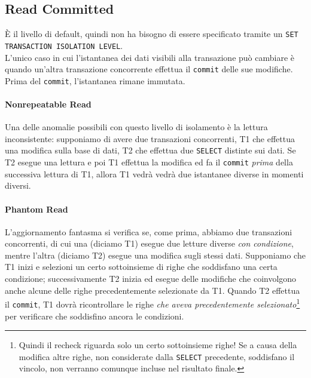 \documentclass[12pt,a4paper]{book}
\begin{document}
	\subsection{Read Committed}
	È il livello di default, quindi non ha bisogno di essere specificato tramite un \texttt{SET TRANSACTION ISOLATION LEVEL}.\\
	L'unico caso in cui l'istantanea dei dati visibili alla transazione può cambiare è quando un'altra transazione concorrente effettua il \texttt{commit} delle sue modifiche. Prima del \texttt{commit}, l'istantanea rimane immutata.
	\paragraph{Nonrepeatable Read} Una delle anomalie possibili con questo livello di isolamento è la lettura inconsistente: supponiamo di avere due transazioni concorrenti, T1 che effettua una modifica sulla base di dati, T2 che effettua due \texttt{SELECT} distinte sui dati. Se T2 esegue una lettura e poi T1 effettua la modifica ed fa il \texttt{commit} \textit{prima} della successiva lettura di T1, allora T1 vedrà vedrà due istantanee diverse in momenti diversi.\\
	\paragraph{Phantom Read} L'aggiornamento fantasma si verifica se, come prima, abbiamo due transazioni concorrenti, di cui una (diciamo T1) esegue due letture diverse \textit{con condizione}, mentre l'altra (diciamo T2) esegue una modifica sugli stessi dati.
	Supponiamo che T1 inizi e selezioni un certo sottoinsieme di righe che soddisfano una certa condizione; successivamente T2 inizia ed esegue delle modifiche che coinvolgono anche alcune delle righe precedentemente selezionate da T1. Quando T2 effettua il \texttt{commit}, T1 dovrà ricontrollare le righe \textit{che aveva precedentemente selezionato}\footnote{Quindi il recheck riguarda solo un certo sottoinsieme righe! Se a causa della modifica altre righe, non considerate dalla \texttt{SELECT} precedente, soddisfano il vincolo, non verranno comunque incluse nel risultato finale.} per verificare che soddisfino ancora le condizioni.
\end{document}
